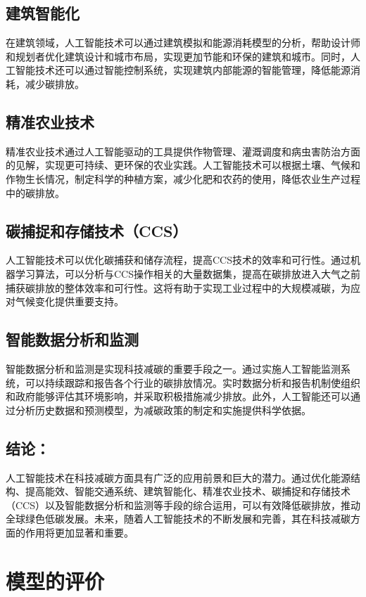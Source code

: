 \documentclass[withoutpreface,bwprint]{cumcmthesis}
\begin{document}
\subsection{建筑智能化}
在建筑领域，人工智能技术可以通过建筑模拟和能源消耗模型的分析，帮助设计师和规划者优化建筑设计和城市布局，实现更加节能和环保的建筑和城市。同时，人工智能技术还可以通过智能控制系统，实现建筑内部能源的智能管理，降低能源消耗，减少碳排放。

\subsection{精准农业技术}
精准农业技术通过人工智能驱动的工具提供作物管理、灌溉调度和病虫害防治方面的见解，实现更可持续、更环保的农业实践。人工智能技术可以根据土壤、气候和作物生长情况，制定科学的种植方案，减少化肥和农药的使用，降低农业生产过程中的碳排放。

\subsection{碳捕捉和存储技术（CCS）}
人工智能技术可以优化碳捕获和储存流程，提高CCS技术的效率和可行性。通过机器学习算法，可以分析与CCS操作相关的大量数据集，提高在碳排放进入大气之前捕获碳排放的整体效率和可行性。这将有助于实现工业过程中的大规模减碳，为应对气候变化提供重要支持。

\subsection{智能数据分析和监测}
智能数据分析和监测是实现科技减碳的重要手段之一。通过实施人工智能监测系统，可以持续跟踪和报告各个行业的碳排放情况。实时数据分析和报告机制使组织和政府能够评估其环境影响，并采取积极措施减少排放。此外，人工智能还可以通过分析历史数据和预测模型，为减碳政策的制定和实施提供科学依据。

\subsection{结论：}
人工智能技术在科技减碳方面具有广泛的应用前景和巨大的潜力。通过优化能源结构、提高能效、智能交通系统、建筑智能化、精准农业技术、碳捕捉和存储技术（CCS）以及智能数据分析和监测等手段的综合运用，可以有效降低碳排放，推动全球绿色低碳发展。未来，随着人工智能技术的不断发展和完善，其在科技减碳方面的作用将更加显著和重要。


\section{模型的评价}
\end{document}
